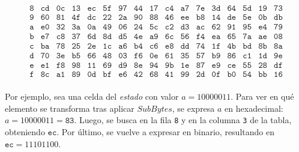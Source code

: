 \begin{table}[H]
\[\begin{array}{c|*{16}{c}}
\texttt{8} & \texttt{cd} & \texttt{0c} & \texttt{13} & \texttt{ec} & \texttt{5f} & \texttt{97} & \texttt{44} & \texttt{17} & \texttt{c4} & \texttt{a7} & \texttt{7e} & \texttt{3d} & \texttt{64} & \texttt{5d} & \texttt{19} & \texttt{73} \\
\texttt{9} & \texttt{60} & \texttt{81} & \texttt{4f} & \texttt{dc} & \texttt{22} & \texttt{2a} & \texttt{90} & \texttt{88} & \texttt{46} & \texttt{ee} & \texttt{b8} & \texttt{14} & \texttt{de} & \texttt{5e} & \texttt{0b} & \texttt{db} \\
\texttt{a} & \texttt{e0} & \texttt{32} & \texttt{3a} & \texttt{0a} & \texttt{49} & \texttt{06} & \texttt{24} & \texttt{5c} & \texttt{c2} & \texttt{d3} & \texttt{ac} & \texttt{62} & \texttt{91} & \texttt{95} & \texttt{e4} & \texttt{79} \\
\texttt{b} & \texttt{e7} & \texttt{c8} & \texttt{37} & \texttt{6d} & \texttt{8d} & \texttt{d5} & \texttt{4e} & \texttt{a9} & \texttt{6c} & \texttt{56} & \texttt{f4} & \texttt{ea} & \texttt{65} & \texttt{7a} & \texttt{ae} & \texttt{08} \\
\texttt{c} & \texttt{ba} & \texttt{78} & \texttt{25} & \texttt{2e} & \texttt{1c} & \texttt{a6} & \texttt{b4} & \texttt{c6} & \texttt{e8} & \texttt{dd} & \texttt{74} & \texttt{1f} & \texttt{4b} & \texttt{bd} & \texttt{8b} & \texttt{8a} \\
\texttt{d} & \texttt{70} & \texttt{3e} & \texttt{b5} & \texttt{66} & \texttt{48} & \texttt{03} & \texttt{f6} & \texttt{0e} & \texttt{61} & \texttt{35} & \texttt{57} & \texttt{b9} & \texttt{86} & \texttt{c1} & \texttt{1d} & \texttt{9e} \\
\texttt{e} & \texttt{e1} & \texttt{f8} & \texttt{98} & \texttt{11} & \texttt{69} & \texttt{d9} & \texttt{8e} & \texttt{94} & \texttt{9b} & \texttt{1e} & \texttt{87} & \texttt{e9} & \texttt{ce} & \texttt{55} & \texttt{28} & \texttt{df} \\
\texttt{f} & \texttt{8c} & \texttt{a1} & \texttt{89} & \texttt{0d} & \texttt{bf} & \texttt{e6} & \texttt{42} & \texttt{68} & \texttt{41} & \texttt{99} & \texttt{2d} & \texttt{0f} & \texttt{b0} & \texttt{54} & \texttt{bb} & \texttt{16} \\
\end{array}
\]
\vspace{-1em}
\caption{S-box de AES}
\label{tab:sbox}
\end{table}


    Por ejemplo, sea una celda del \textit{estado} con valor $a = 10000011$. Para ver en qué elemento se transforma tras aplicar $SubBytes$, se expresa $a$ en hexadecimal: $a = 10000011 =\texttt{83}$. Luego, se busca en la fila \texttt{8} y en la columna \texttt{3} de la tabla, obteniendo $\texttt{ec}$. Por último, se vuelve a expresar en binario, resultando en $\texttt{ec} = 11101100$.
    
